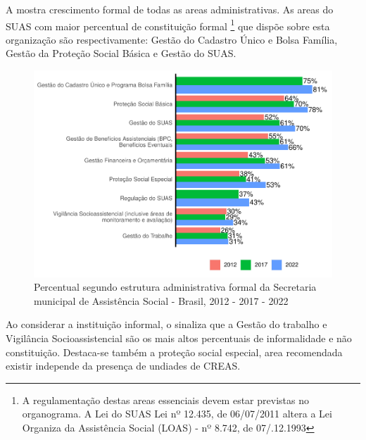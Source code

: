 \documentclass[
  brazilian]{report}
\begin{document}
A  mostra crescimento formal de todas as areas
administrativas. As areas do SUAS com maior percentual de constituição
formal \footnote{A
regulamentação destas areas essenciais devem estar previstas no
organograma. A Lei do SUAS Lei nº 12.435, de 06/07/2011 altera a Lei Organiza da Assistência 
Social (LOAS) - nº 8.742, de 07/.12.1993} que dispõe sobre esta
organização são respectivamente: Gestão do Cadastro Único e Bolsa
Família, Gestão da Proteção Social Básica e Gestão do SUAS.

\begin{figure}
\includegraphics{Censo-SUAS-2022_files/figure-latex/munic_sub-1} \caption[Percentual segundo estrutura administrativa formal da Secretaria municipal de Assistência Social - Brasil, 2012 - 2017 - 2022]{Percentual segundo estrutura administrativa formal da Secretaria municipal de Assistência Social - Brasil, 2012 - 2017 - 2022}\label{fig:munic_sub}
\end{figure}

Ao considerar a instituição informal, o
 sinaliza que a Gestão do
trabalho e Vigilância Socioassistencial são os mais altos percentuais de
informalidade e não constituição. Destaca-se também a proteção social
especial, area recomendada existir independe da presença de undiades de
CREAS.
\end{document}
